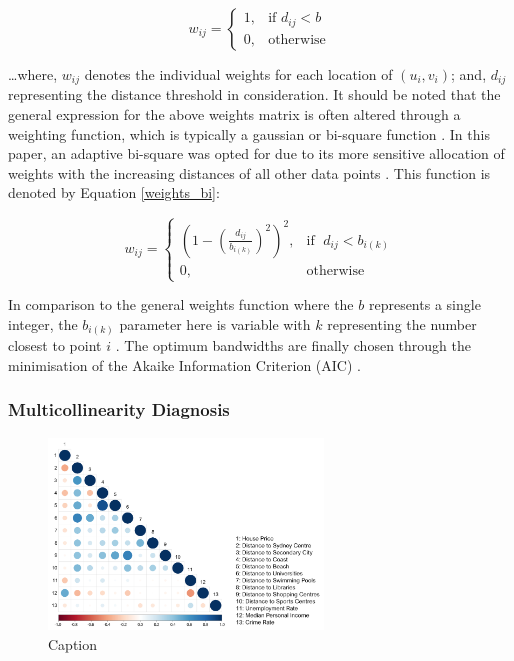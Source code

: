 \begin{equation}
w_{ij}= \begin{cases}
1, & \text{if } d_{ij} < b \\ 
0, & \text{otherwise} 
\end{cases}
\label{weights}
\end{equation}

\ldots where, $w_{ij}$ denotes the individual weights for each location of $(u_{i},v_{i})$; and, $d_{ij}$ representing the distance threshold in consideration. It should be noted that the general expression for the above weights matrix is often altered through a weighting function, which is typically a gaussian or bi-square function \citep{fotheringham2003geographically}. In this paper, an adaptive bi-square was opted for due to its more sensitive allocation of weights with the increasing distances of all other data points \citep{fotheringham2003geographically,fotheringham2016geographically, oshan2019comment}. This function is denoted by Equation \ref{weights_bi}:

\begin{equation}
w_{ij}= \begin{cases}
\left (1 - (\frac{d_{ij}}{b_{i(k)}})^{2}  \right )^{2}, & \text{if } \; d_{ij} < b_{i(k)} \\ 
0, & \text{otherwise} 
\end{cases}
\label{weights_bi}
\end{equation}

In comparison to the general weights function where the $b$ represents a single integer, the $b_{i(k)}$ parameter here is variable with $k$ representing the number closest to point $i$ \citep{albuquerque2017geographically}. The optimum bandwidths are finally chosen through the minimisation of the Akaike Information Criterion (AIC) \citep{fotheringham2003geographically,fabian2014method,albuquerque2017geographically}.\\

\subsubsection{Multicollinearity Diagnosis}

\begin{figure}[!ht]
    \centering \small
    \includegraphics[width=0.65\textwidth]{body/figures/Entropy_CorrPlot2.png}
    \caption{Caption}
    \label{fig:collinear}
\end{figure}

